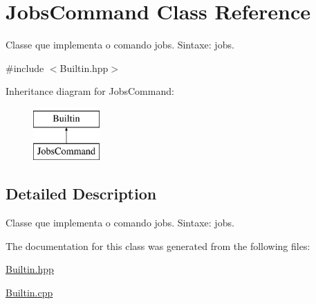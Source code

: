 \hypertarget{classJobsCommand}{
\section{JobsCommand Class Reference}
\label{classJobsCommand}
}


Classe que implementa o comando jobs. Sintaxe: jobs.  




{\ttfamily \#include $<$Builtin.hpp$>$}

Inheritance diagram for JobsCommand:\begin{figure}[H]
\begin{center}
\leavevmode
\includegraphics[height=2.000000cm]{classJobsCommand}
\end{center}
\end{figure}


\subsection{Detailed Description}
Classe que implementa o comando jobs. Sintaxe: jobs. 

The documentation for this class was generated from the following files:\begin{DoxyCompactItemize}
\item 
\hyperlink{Builtin_8hpp}{Builtin.hpp}\item 
\hyperlink{Builtin_8cpp}{Builtin.cpp}\end{DoxyCompactItemize}
